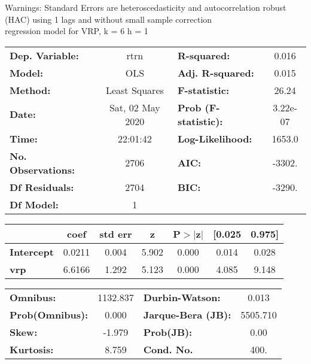 Warnings: \newline
 [1] Standard Errors are heteroscedasticity and autocorrelation robust (HAC) using 1 lags and without small sample correction\\ 

regression model for VRP, k = 6 h = 1\begin{center}
\begin{tabular}{lclc}
\toprule
\textbf{Dep. Variable:}    &       rtrn       & \textbf{  R-squared:         } &     0.016   \\
\textbf{Model:}            &       OLS        & \textbf{  Adj. R-squared:    } &     0.015   \\
\textbf{Method:}           &  Least Squares   & \textbf{  F-statistic:       } &     26.24   \\
\textbf{Date:}             & Sat, 02 May 2020 & \textbf{  Prob (F-statistic):} &  3.22e-07   \\
\textbf{Time:}             &     22:01:42     & \textbf{  Log-Likelihood:    } &    1653.0   \\
\textbf{No. Observations:} &        2706      & \textbf{  AIC:               } &    -3302.   \\
\textbf{Df Residuals:}     &        2704      & \textbf{  BIC:               } &    -3290.   \\
\textbf{Df Model:}         &           1      & \textbf{                     } &             \\
\bottomrule
\end{tabular}
\begin{tabular}{lcccccc}
                   & \textbf{coef} & \textbf{std err} & \textbf{z} & \textbf{P$> |$z$|$} & \textbf{[0.025} & \textbf{0.975]}  \\
\midrule
\textbf{Intercept} &       0.0211  &        0.004     &     5.902  &         0.000        &        0.014    &        0.028     \\
\textbf{vrp}       &       6.6166  &        1.292     &     5.123  &         0.000        &        4.085    &        9.148     \\
\bottomrule
\end{tabular}
\begin{tabular}{lclc}
\textbf{Omnibus:}       & 1132.837 & \textbf{  Durbin-Watson:     } &    0.013  \\
\textbf{Prob(Omnibus):} &   0.000  & \textbf{  Jarque-Bera (JB):  } & 5505.710  \\
\textbf{Skew:}          &  -1.979  & \textbf{  Prob(JB):          } &     0.00  \\
\textbf{Kurtosis:}      &   8.759  & \textbf{  Cond. No.          } &     400.  \\
\bottomrule
\end{tabular}
\end{center}

